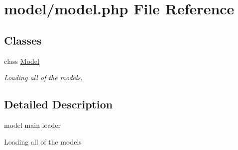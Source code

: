 \hypertarget{model_8php}{\section{model/model.php File Reference}
\label{model_8php}
}
\subsection*{Classes}
\begin{DoxyCompactItemize}
\item 
class \hyperlink{classModel}{Model}
\begin{DoxyCompactList}\small\item\em Loading all of the models. \end{DoxyCompactList}\end{DoxyCompactItemize}


\subsection{Detailed Description}
model main loader

Loading all of the models 
